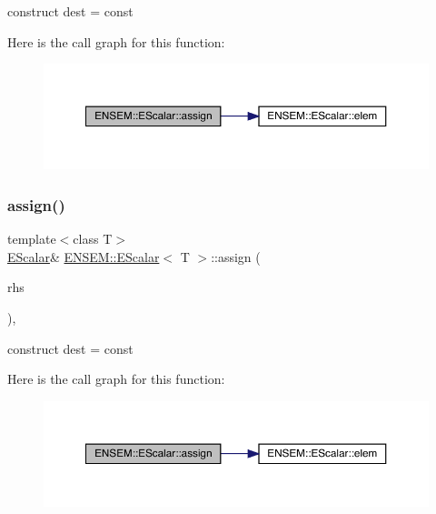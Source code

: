 construct dest = const 

Here is the call graph for this function\+:
\nopagebreak
\begin{figure}[H]
\begin{center}
\leavevmode
\includegraphics[width=350pt]{d0/d82/classENSEM_1_1EScalar_a9b88ad4d69d05f69b6483701487ddb74_cgraph}
\end{center}
\end{figure}
\mbox{\label{classENSEM_1_1EScalar_a9b88ad4d69d05f69b6483701487ddb74}} 
\subsubsection{\texorpdfstring{assign()}{assign()}\hspace{0.1cm}{\footnotesize\ttfamily [3/9]}}
{\footnotesize\ttfamily template$<$class T$>$ \\
\mbox{\hyperlink{classENSEM_1_1EScalar}{E\+Scalar}}\& \mbox{\hyperlink{classENSEM_1_1EScalar}{E\+N\+S\+E\+M\+::\+E\+Scalar}}$<$ T $>$\+::assign (\begin{DoxyParamCaption}\item[{const typename \mbox{\hyperlink{structENSEM_1_1WordType}{Word\+Type}}$<$ T $>$\+::Type\+\_\+t \&}]{rhs }\end{DoxyParamCaption})\hspace{0.3cm}{\ttfamily [inline]}, {\ttfamily [protected]}}



construct dest = const 

Here is the call graph for this function\+:
\nopagebreak
\begin{figure}[H]
\begin{center}
\leavevmode
\includegraphics[width=350pt]{d0/d82/classENSEM_1_1EScalar_a9b88ad4d69d05f69b6483701487ddb74_cgraph}
\end{center}
\end{figure}
\mbox{\label{classENSEM_1_1EScalar_a6900444b0a609115a30ef8fc95a43da5}} 
